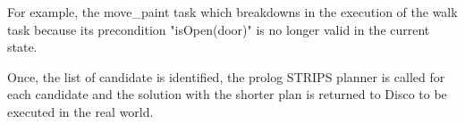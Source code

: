 \documentclass{article}
\begin{document}
	For example, the move_paint task which breakdowns in the execution of the walk task because its precondition "isOpen(door)" is no longer valid in the current state. 
	
	 Once, the list of candidate is identified, the prolog STRIPS planner is called for each candidate and the solution with the shorter plan is returned to Disco to be executed in the real world.
	 
	 
	 
\end{document}
